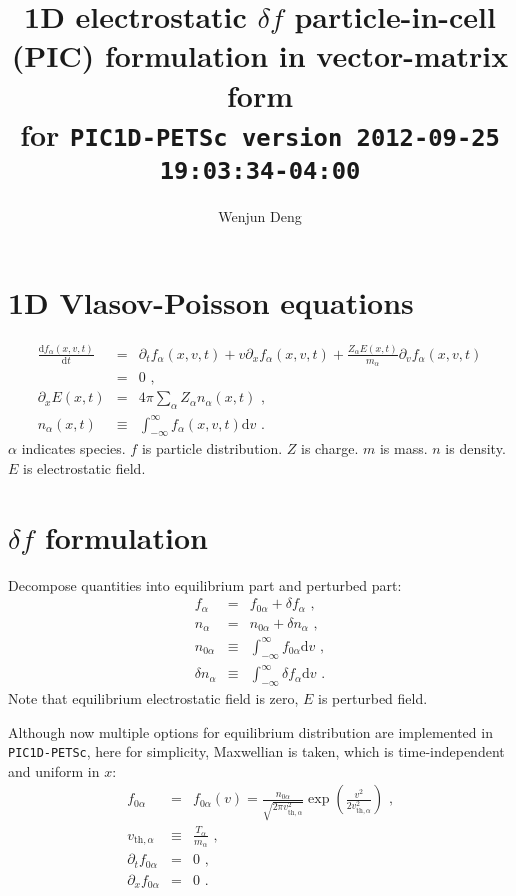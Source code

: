 \documentclass[12pt]{article}
\begin{document}
\newcommand{\md}{\mathrm{d}}
\newcommand{\me}{\mathrm{e}}

\title{1D electrostatic $\delta f$ particle-in-cell (PIC) formulation in vector-matrix form \\
\large for \texttt{PIC1D-PETSc version 2012-09-25 19:03:34-04:00}}
\author{Wenjun Deng}
\maketitle


\section{1D Vlasov-Poisson equations}

\begin{eqnarray}
	\frac{\md f_\alpha(x, v, t)}{\md t} & = & \partial_t f_\alpha(x, v, t) + v \partial_x f_\alpha(x, v, t) + \frac{Z_\alpha E(x, t)}{m_\alpha} \partial_v f_\alpha(x, v, t) \nonumber \\
	& = & 0 \textrm{ ,} \\
	\partial_x E(x, t) & = & 4 \pi \sum_\alpha Z_\alpha n_\alpha(x, t) \textrm{ ,} \\
	n_\alpha(x, t) & \equiv & \int_{-\infty}^{\infty} f_\alpha(x, v, t) \md v \textrm{ .}
\end{eqnarray}
$\alpha$ indicates species.
$f$ is particle distribution.
$Z$ is charge.
$m$ is mass.
$n$ is density.
$E$ is electrostatic field.


\section{$\delta f$ formulation}

Decompose quantities into equilibrium part and perturbed part:
\begin{eqnarray}
	f_\alpha & = & f_{0 \alpha} + \delta f_\alpha \textrm{ ,} \\
	n_\alpha & = & n_{0 \alpha} + \delta n_\alpha \textrm{ ,} \\
	n_{0 \alpha} & \equiv & \int_{-\infty}^{\infty} f_{0 \alpha} \md v \textrm{ ,} \\
	\delta n_{\alpha} & \equiv & \int_{-\infty}^{\infty} \delta f_{\alpha} \md v \textrm{ .}
\end{eqnarray}
Note that equilibrium electrostatic field is zero, $E$ is perturbed field.

Although now multiple options for equilibrium distribution are implemented in \texttt{PIC1D-PETSc}, here for simplicity, Maxwellian is taken, which is time-independent and uniform in $x$:
\begin{eqnarray}
	f_{0 \alpha} & = & f_{0 \alpha}(v) = \frac{n_{0 \alpha}}{\sqrt{2 \pi v_{\mathrm{th}, \alpha}^2}} \exp \left( \frac{v^2}{2 v_{\mathrm{th}, \alpha}^2} \right) \textrm{ ,} \\
	v_{\mathrm{th}, \alpha} & \equiv & \frac{T_\alpha}{m_\alpha} \textrm{ ,} \\
	\partial_t f_{0 \alpha} & = & 0 \textrm{ ,} \\
	\partial_x f_{0 \alpha} & = & 0 \textrm{ .}
\end{eqnarray}
\end{document}
